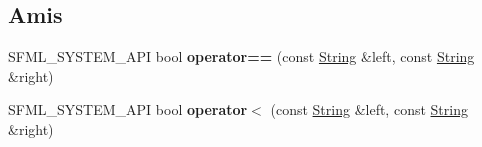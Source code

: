 \subsection*{Amis}
\begin{DoxyCompactItemize}
\item 
\mbox{\label{classsf_1_1String_a2a385459fa9a237e61a712fa956d489e}} 
S\+F\+M\+L\+\_\+\+S\+Y\+S\+T\+E\+M\+\_\+\+A\+PI bool {\bfseries operator==} (const \hyperlink{classsf_1_1String}{String} \&left, const \hyperlink{classsf_1_1String}{String} \&right)
\item 
\mbox{\label{classsf_1_1String_ac2ca5a7703402a2bbafd85eec6d1e846}} 
S\+F\+M\+L\+\_\+\+S\+Y\+S\+T\+E\+M\+\_\+\+A\+PI bool {\bfseries operator$<$} (const \hyperlink{classsf_1_1String}{String} \&left, const \hyperlink{classsf_1_1String}{String} \&right)
\end{DoxyCompactItemize}
